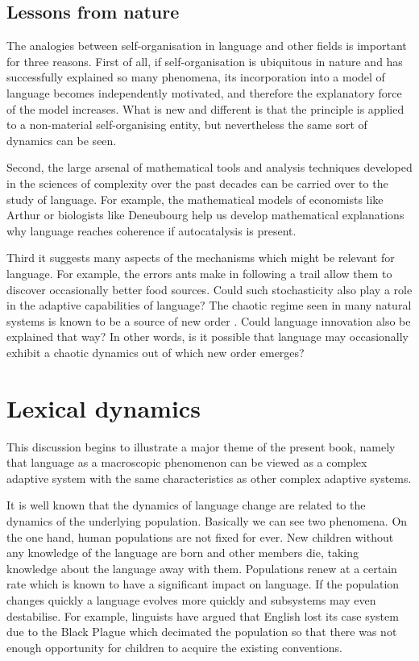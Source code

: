 \subsection{Lessons from nature}

The analogies between self-organisation 
in language and other fields is important for three reasons. 
First of all, if self-organisation is ubiquitous in nature
and has successfully explained so many phenomena, its incorporation
into a model of language becomes independently motivated, and
therefore the explanatory force of the model increases. 
What is new and different is that the principle is applied
to a non-material self-organising entity, but nevertheless
the same sort of dynamics can be seen. 

Second, the large arsenal of 
mathematical tools and analysis techniques
developed in the sciences of complexity over the past decades
can be carried over to the study of language. For example, 
the mathematical models of economists like 
Arthur or biologists like Deneubourg help us develop 
mathematical explanations why language reaches coherence if autocatalysis
is present.

Third it suggests many aspects of the mechanisms
which might be relevant for language. For example, the errors ants make 
in following a trail allow them to discover occasionally 
better food sources. Could such stochasticity also play a role 
in the adaptive capabilities of language? The chaotic regime
seen in many natural systems is known to be a source
of new order \citep{Kaneko:1996}. Could language innovation 
also be explained that way? In other words, is it possible  
that language may occasionally exhibit a chaotic
dynamics out of which new order emerges?

\section{Lexical dynamics} 

This discussion begins to illustrate a major theme 
of the present book, namely that language as a 
macroscopic phenomenon can be viewed as a complex adaptive 
system with the same characteristics as other complex
adaptive systems. 

It is well known that the dynamics of language change 
are related to the dynamics of the underlying population. Basically
we can see two phenomena. On the one hand, human populations
are not fixed for ever. New children without any knowledge
of the language are born
and other members die, taking knowledge about the 
language away with them. Populations renew at a certain rate 
which is known to have a significant impact on language. 
If the population changes quickly a language
evolves more quickly and subsystems may even destabilise. 
For example, linguists have argued that English lost its 
case system due to the Black Plague which decimated the 
population so that there was not enough opportunity for 
children to acquire the existing conventions. 

